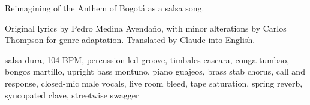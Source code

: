 

\begin{notes}
Reimagining of the Anthem of Bogotá as a salsa song.

Original lyrics by Pedro Medina Avendaño, with minor alterations by Carlos Thompson for genre adaptation. %
Translated by Claude into English.
\end{notes}

\begin{style}
salsa dura, 104 BPM, percussion-led groove, timbales cascara, conga tumbao, bongos martillo, upright bass montuno, piano guajeos, brass stab chorus, call and response, closed-mic male vocals, live room bleed, tape saturation, spring reverb, syncopated clave, streetwise swagger
\end{style}


